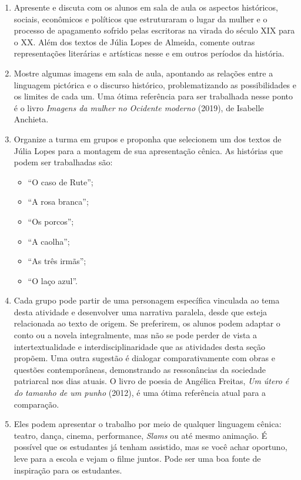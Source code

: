 \documentclass[12pt]{extarticle}
\begin{document}
\begin{enumerate}
\item
Apresente e discuta com os alunos em sala de
aula os aspectos históricos, sociais, econômicos e políticos que
estruturaram o lugar da mulher e o processo de apagamento sofrido pelas
escritoras na virada do século \textsc{XIX} para o \textsc{XX}. Além dos textos de Júlia
Lopes de Almeida, comente outras representações literárias e artísticas
nesse e em outros períodos da história.

\item
Mostre algumas imagens em sala de aula, apontando as relações entre a
linguagem pictórica e o discurso histórico, problematizando as
possibilidades e os limites de cada um. Uma ótima referência para ser
trabalhada nesse ponto é o livro \emph{Imagens da mulher no Ocidente
moderno} (2019), de Isabelle Anchieta.


\item
Organize a turma em grupos e proponha que selecionem um dos textos de
Júlia Lopes para a montagem de sua apresentação cênica. As histórias que
podem ser trabalhadas são:

\begin{itemize}
\item
  ``O caso de Rute'';
\item
  ``A rosa branca'';
\item
  ``Os porcos'';
\item
  ``A caolha'';
\item
  ``As três irmãs'';
\item
  ``O laço azul''.
\end{itemize}

\item
Cada grupo pode partir de uma personagem específica vinculada ao tema
desta atividade e desenvolver uma narrativa paralela, desde que esteja
relacionada ao texto de origem. Se preferirem, os alunos podem adaptar o
conto ou a novela integralmente, mas não se pode perder de vista a
intertextualidade e interdisciplinaridade que as atividades desta seção
propõem. Uma outra sugestão é dialogar comparativamente com obras e
questões contemporâneas, demonstrando as ressonâncias da sociedade
patriarcal nos dias atuais. O livro de poesia de Angélica Freitas,
\emph{Um útero é do tamanho de um punho} (2012), é uma ótima referência
atual para a comparação.

\item
Eles podem apresentar o trabalho por meio de qualquer linguagem
cênica: teatro, dança, cinema, performance, \emph{Slams} ou até mesmo
animação. É possível que os estudantes já tenham assistido, mas se você
achar oportuno, leve para a escola e vejam o filme juntos. Pode ser uma
boa fonte de inspiração para os estudantes.


\end{enumerate}
\end{document}
